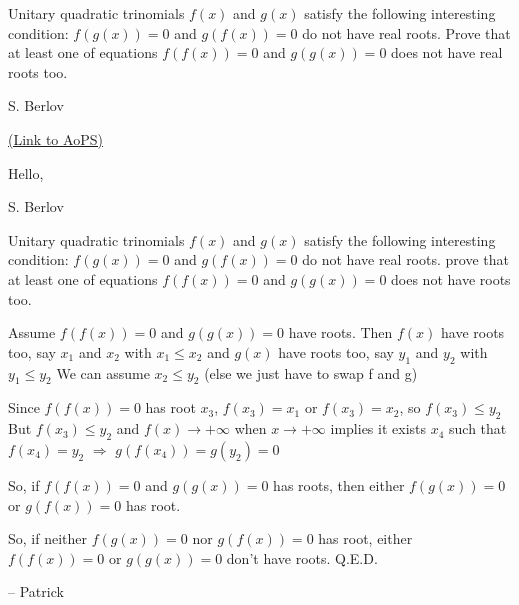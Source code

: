 \begin{problem}
	Unitary quadratic trinomials $ f(x)$ and $ g(x)$ satisfy the following interesting condition: $ f(g(x)) = 0$ and $ g(f(x)) = 0$ do not have real roots. Prove that at least one of equations $ f(f(x)) = 0$ and $ g(g(x)) = 0$ does not have real roots too.

\begin{italicized}S. Berlov \end{italicized}
	\flushright \href{https://artofproblemsolving.com/community/c6h147156}{(Link to AoPS)}
\end{problem}



\begin{solution}
	Hello,
\begin{tcolorbox}\begin{italicized}S. Berlov \end{italicized}
Unitary quadratic trinomials $f(x)$ and $g(x)$ satisfy
the following interesting condition: $f(g(x))=0$ and $g(f(x))=0$ 
do not have real roots. prove that at least one of equations
$f(f(x))=0$ and $g(g(x))=0$ does not have roots too.\end{tcolorbox}

Assume $f(f(x))=0$ and $g(g(x))=0$ have roots. Then $f(x)$ have roots too, say $x_{1}$ and $x_{2}$ with $x_{1}\leq x_{2}$ and $g(x)$ have roots too, say $y_{1}$ and $y_{2}$ with $y_{1}\leq y_{2}$
We can assume $x_{2}\leq y_{2}$ (else we just have to swap f and g)

Since $f(f(x))=0$ has root $x_{3}$, $f(x_{3})=x_{1}$ or $f(x_{3})=x_{2}$, so $f(x_{3})\leq y_{2}$
But $f(x_{3})\leq y_{2}$ and $f(x) \rightarrow+\infty$  when $x \rightarrow+\infty$  implies it exists $x_{4}$ such that $f(x_{4})=y_{2}$ $\Rightarrow $  $g(f(x_{4}))=g(y_{2})=0$

So, if $f(f(x))=0$ and $g(g(x))=0$ has roots, then either $f(g(x))=0$ or $g(f(x))=0$ has root.

So, if neither $f(g(x))=0$ nor $g(f(x))=0$ has root, either $f(f(x))=0$ or $g(g(x))=0$ don't have roots.
Q.E.D.

-- 
Patrick
\end{solution}



